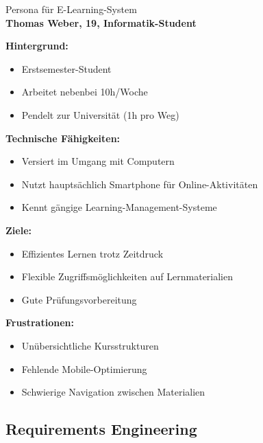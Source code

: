 \begin{example2}{Persona für E-Learning-System}\\
\textbf{Thomas Weber, 19, Informatik-Student}

\textbf{Hintergrund:}
\begin{itemize}
    \item Erstsemester-Student
    \item Arbeitet nebenbei 10h/Woche
    \item Pendelt zur Universität (1h pro Weg)
\end{itemize}

\textbf{Technische Fähigkeiten:}
\begin{itemize}
    \item Versiert im Umgang mit Computern
    \item Nutzt hauptsächlich Smartphone für Online-Aktivitäten
    \item Kennt gängige Learning-Management-Systeme
\end{itemize}

\textbf{Ziele:}
\begin{itemize}
    \item Effizientes Lernen trotz Zeitdruck
    \item Flexible Zugriffsmöglichkeiten auf Lernmaterialien
    \item Gute Prüfungsvorbereitung
\end{itemize}

\textbf{Frustrationen:}
\begin{itemize}
    \item Unübersichtliche Kursstrukturen
    \item Fehlende Mobile-Optimierung
    \item Schwierige Navigation zwischen Materialien
\end{itemize}
\end{example2}

\subsection{Requirements Engineering}

